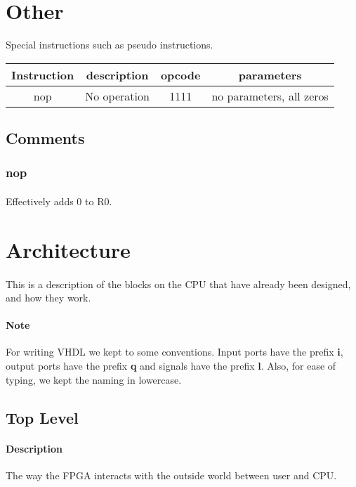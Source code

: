 \documentclass[a4paper]{article}
\begin{document}
\section{Other}
Special instructions such as pseudo instructions.

\begin{center}
\begin{tabular}{| c | c | c | c |}
\hline
Instruction & description & opcode & parameters \\ \hline
nop & No operation & 1111 & no parameters, all zeros\\ \hline
\end{tabular}
\end{center}

\subsection{Comments}
\subsubsection{nop}
\paragraph{}Effectively adds 0 to R0.

\section{Architecture}
\paragraph{}
This is a description of the blocks on the CPU that have already been designed, and how they work.
\paragraph{Note}
For writing VHDL we kept to some conventions. Input ports have the prefix \textbf{i}, output ports have the prefix \textbf{q} and signals have the prefix \textbf{l}. Also, for ease of typing, we kept the naming in lowercase.

\subsection{Top Level}
\paragraph{Description}
The way the FPGA interacts with the outside world between user and CPU.
\end{document}
